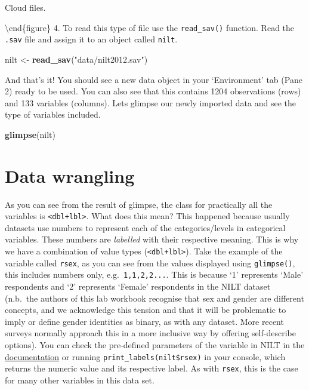 \documentclass[
]{book}
\newenvironment{Shaded}{\begin{snugshade}}{\end{snugshade}}
\newcommand{\FunctionTok}[1]{\textcolor[rgb]{0.13,0.29,0.53}{\textbf{#1}}}
\newcommand{\NormalTok}[1]{#1}
\newcommand{\OtherTok}[1]{\textcolor[rgb]{0.56,0.35,0.01}{#1}}
\newcommand{\StringTok}[1]{\textcolor[rgb]{0.31,0.60,0.02}{#1}}
\begin{document}
\caption{Cloud files.}

\label{fig:unnamed-chunk-38}
\textbackslash end\{figure\}
4. To read this type of file use the \texttt{read\_sav()} function. Read the \texttt{.sav} file and assign it to an object called \texttt{nilt}.

\begin{Shaded}
\begin{Highlighting}[]
\NormalTok{nilt }\OtherTok{\textless{}{-}} \FunctionTok{read\_sav}\NormalTok{(}\StringTok{"data/nilt2012.sav"}\NormalTok{)}
\end{Highlighting}
\end{Shaded}

And that's it! You should see a new data object in your `Environment' tab (Pane 2) ready to be used. You can also see that this contains 1204 observations (rows) and 133 variables (columns). Lets glimpse our newly imported data and see the type of variables included.

\begin{Shaded}
\begin{Highlighting}[]
\FunctionTok{glimpse}\NormalTok{(nilt)}
\end{Highlighting}
\end{Shaded}

\hypertarget{data-wrangling-2}{%
\section{Data wrangling}\label{data-wrangling-2}}

As you can see from the result of glimpse, the class for practically all the variables is \texttt{\textless{}dbl+lbl\textgreater{}}. What does this mean? This happened because usually datasets use numbers to represent each of the categories/levels in categorical variables. These numbers are \emph{labelled} with their respective meaning. This is why we have a combination of value types (\texttt{\textless{}dbl+lbl\textgreater{}}). Take the example of the variable called \texttt{rsex}, as you can see from the values displayed using \texttt{glimpse()}, this includes numbers only, e.g.~\texttt{1,1,2,2...}. This is because `1' represents `Male' respondents and `2' represents `Female' respondents in the NILT dataset (n.b.~the authors of this lab workbook recognise that sex and gender are different concepts, and we acknowledge this tension and that it will be problematic to imply or define gender identities as binary, as with any dataset. More recent surveys normally approach this in a more inclusive way by offering self-describe options). You can check the pre-defined parameters of the variable in NILT in the \href{https://www.ark.ac.uk/teaching/NILT2012TeachingResources.pdf}{documentation} or running \texttt{print\_labels(nilt\$rsex)} in your console, which returns the numeric value and its respective label. As with \texttt{rsex}, this is the case for many other variables in this data set.
\end{document}
